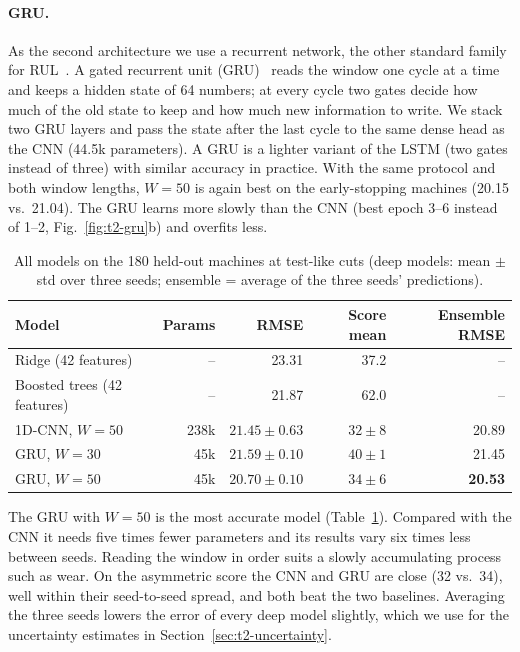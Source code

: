\paragraph{GRU.} As the second architecture we use a recurrent network, the other standard family
for RUL~\cite{zheng2017}. A gated recurrent unit (GRU)~\cite{cho2014} reads the window one cycle at
a time and keeps a hidden state of 64 numbers; at every cycle two gates decide how much of the old
state to keep and how much new information to write. We stack two GRU layers and pass the state
after the last cycle to the same dense head as the CNN (44.5k parameters). A GRU is a lighter
variant of the LSTM (two gates instead of three) with similar accuracy in practice. With the same
protocol and both window lengths, $W=50$ is again best on the early-stopping machines (20.15 vs.\
21.04). The GRU learns more slowly than the CNN (best epoch 3--6 instead of 1--2,
Fig.~\ref{fig:t2-gru}b) and overfits less.

\begin{table}[t]
  \centering
  \caption{All models on the 180 held-out machines at test-like cuts (deep models: mean $\pm$ std
  over three seeds; ensemble = average of the three seeds' predictions).}
  \label{tab:t2-models}
  \begin{tabular}{lrrrr}
    \toprule
    Model & Params & RMSE & Score mean & Ensemble RMSE \\
    \midrule
    Ridge (42 features)            & --   & 23.31            & 37.2         & -- \\
    Boosted trees (42 features)    & --   & 21.87            & 62.0         & -- \\
    1D-CNN, $W=50$                 & 238k & $21.45 \pm 0.63$ & $32 \pm 8$   & 20.89 \\
    GRU, $W=30$                    & 45k  & $21.59 \pm 0.10$ & $40 \pm 1$   & 21.45 \\
    GRU, $W=50$                    & 45k  & $\mathbf{20.70 \pm 0.10}$ & $34 \pm 6$ & \textbf{20.53} \\
    \bottomrule
  \end{tabular}
\end{table}

The GRU with $W=50$ is the most accurate model (Table~\ref{tab:t2-models}). Compared with the CNN it
needs five times fewer parameters and its results vary six times less between seeds. Reading the
window in order suits a slowly accumulating process such as wear. On the asymmetric score the
CNN and GRU are close (32 vs.\ 34), well within their seed-to-seed spread, and both beat the two
baselines. Averaging the three seeds lowers the error of every deep model slightly, which we use
for the uncertainty estimates in Section~\ref{sec:t2-uncertainty}.

